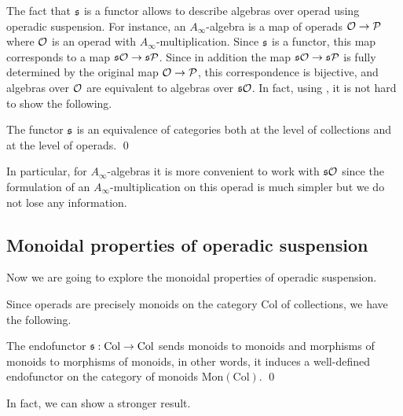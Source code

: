 \documentclass[Thesis.tex]{subfiles}
\begin{document}
The fact that $\mathfrak{s}$ is a functor allows to describe algebras over operad using operadic suspension. For instance, an $A_\infty$-algebra is a map of operads ${\mathcal O}\to\mathcal{P}$ where ${\mathcal O}$ is an operad with $A_\infty$-multiplication. Since $\mathfrak{s}$ is a functor, this map corresponds to a map $\mathfrak{s}{\mathcal O}\to\mathfrak{s}\mathcal{P}$. Since in addition the map $\mathfrak{s}{\mathcal O}\to\mathfrak{s}\mathcal{P}$ is fully determined by the original map ${\mathcal O}\to\mathcal{P}$, this correspondence is bijective, and algebras over ${\mathcal O}$ are equivalent to algebras over $\mathfrak{s}{\mathcal O}$. In fact, using , it is not hard to show the following.

\begin{propo}
The functor $\mathfrak{s}$ is an equivalence of categories both at the level of collections and at the level of operads. \qed %
\end{propo}
In particular, for $A_\infty$-algebras it is more convenient to work with $\mathfrak{s}{\mathcal O}$ since the formulation of an $A_\infty$-multiplication on this operad is much simpler but we do not lose any information.

\subsection{Monoidal properties of operadic suspension}\label{monoidalsusp}
Now we are going to explore the monoidal properties of operadic suspension.

Since operads are precisely monoids on the category $\mathrm{Col}$ of collections, we have the following.
\begin{propo}\label{monoidality} %
The endofunctor $\mathfrak{s}:\mathrm{Col}\to\mathrm{Col}$ sends monoids to monoids and morphisms of monoids to morphisms of monoids, in other words, it induces a well-defined endofunctor on the category of monoids $\mathrm{Mon}(\mathrm{Col})$. \qed%
\end{propo}


In fact, we can show a stronger result.
\end{document}
